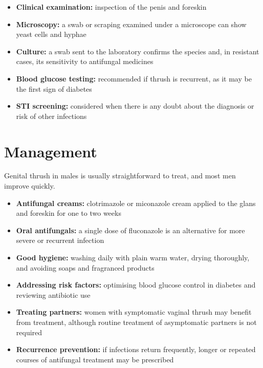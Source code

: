 \begin{itemize}
    \item \textbf{Clinical examination:} inspection of the penis and foreskin
    \item \textbf{Microscopy:} a swab or scraping examined under a microscope can show yeast cells and hyphae
    \item \textbf{Culture:} a swab sent to the laboratory confirms the species and, in resistant cases, its sensitivity to antifungal medicines
    \item \textbf{Blood glucose testing:} recommended if thrush is recurrent, as it may be the first sign of diabetes
    \item \textbf{STI screening:} considered when there is any doubt about the diagnosis or risk of other infections
\end{itemize}

\section*{Management}
Genital thrush in males is usually straightforward to treat, and most men improve quickly.

\begin{itemize}
    \item \textbf{Antifungal creams:} clotrimazole or miconazole cream applied to the glans and foreskin for one to two weeks
    \item \textbf{Oral antifungals:} a single dose of fluconazole is an alternative for more severe or recurrent infection
    \item \textbf{Good hygiene:} washing daily with plain warm water, drying thoroughly, and avoiding soaps and fragranced products
    \item \textbf{Addressing risk factors:} optimising blood glucose control in diabetes and reviewing antibiotic use
    \item \textbf{Treating partners:} women with symptomatic vaginal thrush may benefit from treatment, although routine treatment of asymptomatic partners is not required
    \item \textbf{Recurrence prevention:} if infections return frequently, longer or repeated courses of antifungal treatment may be prescribed
\end{itemize}

